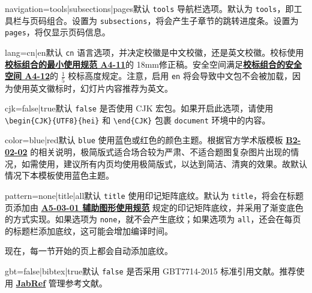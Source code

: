 \documentclass[a4paper,12pt]{article}
\begin{document}
\begin{CJK}{UTF8}{song}
\begin{docKey*}[SJTUBeamermin]{navigation}{=tools|subsections|pages}{默认 \texttt{tools}}
    导航栏选项。默认为 \verb"tools"，即工具栏与页码组合。设置为 \verb"subsections"，将会产生子章节的跳转进度条。设置为 \verb"pages"，将仅显示页码信息。
\end{docKey*}

\begin{docKey*}[SJTUBeamermin]{lang}{=cn|en}{默认 \texttt{cn}}
    语言选项，并决定校徽是中文校徽，还是英文校徽。校标使用\href{http://vi.sjtu.edu.cn/index.php/articles/base/4}{\textbf{校标组合的最小使用规范 A4-11}}的 18mm修正稿。安全空间满足\href{http://vi.sjtu.edu.cn/index.php/articles/base/4}{\textbf{校标组合的安全空间 A4-12}}的 $\frac{1}{5}$ 校标高度规定。注意，启用 \texttt{en} 将会导致中文包不会被加载，因为使用英文徽标时，幻灯片内容推荐为英文。
\end{docKey*}

\begin{docKey*}[SJTUBeamermin]{cjk}{=false|true}{默认 \texttt{false}}
    是否使用 \textsf{CJK} 宏包。如果开启此选项，请使用 \verb"\begin{CJK}{UTF8}{hei}" 和 \verb"\end{CJK}" 包裹 \verb"document" 环境中的内容。
\end{docKey*}

\begin{docKey*}[SJTUBeamermin]{color}{=blue|red}{默认 \texttt{blue}}
    使用蓝色或红色的颜色主题。根据官方学术版模板 \href{http://vi.sjtu.edu.cn/index.php/articles/app/8}{\textbf{B2-02-02}} 的相关说明，极简版式适合场合较为严肃、不适合题图复杂图片出现的情况，如需使用，建议所有内页均使用极简版式，以达到简洁、清爽的效果。故默认情况下本模板使用蓝色主题。
\end{docKey*}

\begin{docKey*}[SJTUBeamermin]{pattern}{=none|title|all}{默认 \texttt{title}}
    使用印记矩阵底纹。默认为 \verb"title"，将会在标题页添加由 \href{http://vi.sjtu.edu.cn/index.php/articles/base/5}{\textbf{A5-03-01 辅助图形使用规范}} 规定的印记矩阵底纹，并采用了渐变底色的方式实现。如果选项为 \verb"none"，就不会产生底纹；如果选项为 \verb"all"，还会在每页的标题栏添加底纹，这可能会增加编译时间。

    现在，每一节开始的页上都会自动添加底纹。
\end{docKey*}

\begin{docKey*}[SJTUBeamermin]{gbt}{=false|bibtex|true}{默认 \texttt{false}}
    是否采用 GBT7714-2015 标准引用文献。推荐使用 \href{https://www.jabref.org/}{\textbf{JabRef}} 管理参考文献。
    

\end{docKey*}
\end{CJK}
\end{document}
